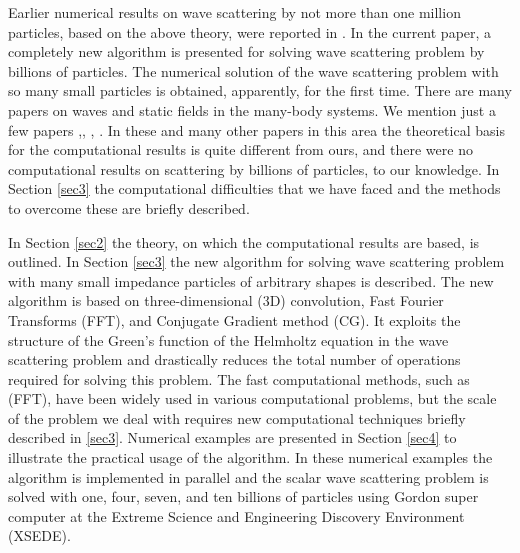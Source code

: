 \documentclass[12pt]{elsarticle}
\numberwithin{equation}{section}
\begin{document}
Earlier numerical results on wave scattering by not more than one million particles, based on the above theory, were reported in \cite{Tran}. In the current paper, a completely new algorithm is presented for solving wave scattering problem by  billions of particles. The numerical solution of the wave scattering problem with so many small particles is obtained, apparently, for the first time. There are many papers on waves and static fields in
the many-body systems. We mention just a few papers \cite{GR1987},\cite{GR1997}, \cite{DardenYorkPedersen}, \cite{PhilWhite}. In these and many
other papers in this area the theoretical basis for the computational results is quite different from ours, and there were no
computational results on scattering by billions of particles, to our knowledge.  In Section  \ref{sec3} the computational difficulties
that we have faced and the methods to overcome these are briefly described.

In  Section \ref{sec2} the theory, on which the computational results are based, is outlined. In  Section \ref{sec3} the new
algorithm for solving wave scattering problem with many small impedance particles of arbitrary shapes is described.
The new algorithm is based on three-dimensional (3D) convolution, Fast Fourier Transforms (FFT), and Conjugate Gradient method (CG). It exploits the structure of the Green's function of the Helmholtz equation in the wave scattering problem and drastically reduces the total number of operations required for solving this problem. The fast computational methods, such as (FFT), have been widely used in various computational
problems, but the scale of the problem we deal with requires new computational  techniques briefly described in  \ref{sec3}.
  Numerical examples are presented in Section \ref{sec4} to illustrate the practical usage of the algorithm. In these numerical examples the algorithm is implemented in parallel and the scalar wave scattering problem is solved with one, four, seven, and ten billions of particles using Gordon super computer at the Extreme Science and Engineering Discovery Environment (XSEDE).
\end{document}
